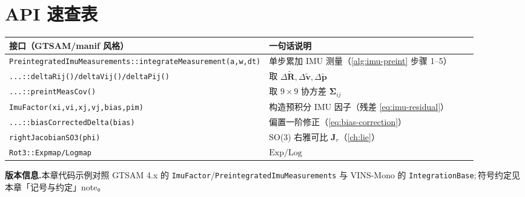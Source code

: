 \section*{API 速查表}
\begin{table}[H]\centering\small
\begin{tabular}{p{0.40\linewidth}p{0.50\linewidth}}
\toprule
接口（GTSAM/manif 风格）& 一句话说明 \\
\midrule
\texttt{PreintegratedImuMeasurements::integrateMeasurement(a,w,dt)} & 单步累加 IMU 测量（\cref{alg:imu-preint} 步骤 1--5） \\
\texttt{...::deltaRij()/\allowbreak deltaVij()/\allowbreak deltaPij()} & 取 $\Delta\tilde{\mathbf R},\Delta\tilde{\mathbf v},\Delta\tilde{\mathbf p}$ \\
\texttt{...::preintMeasCov()} & 取 $9\times9$ 协方差 $\boldsymbol\Sigma_{ij}$ \\
\texttt{ImuFactor(xi,vi,xj,vj,bias,pim)} & 构造预积分 IMU 因子（残差 \cref{eq:imu-residual}） \\
\texttt{...::biasCorrectedDelta(bias)} & 偏置一阶修正（\cref{eq:bias-correction}） \\
\texttt{rightJacobianSO3(phi)} & SO(3) 右雅可比 $\mathbf J_r$（\cref{ch:lie}） \\
\texttt{Rot3::Expmap/\allowbreak Logmap} & $\mathrm{Exp}/\mathrm{Log}$ \\
\bottomrule
\end{tabular}
\end{table}

\noindent\textbf{版本信息.}\;本章代码示例对照 GTSAM 4.x 的 \texttt{ImuFactor}/\allowbreak\texttt{PreintegratedImuMeasurements} 与 VINS-Mono 的 \texttt{IntegrationBase};\,符号约定见本章「记号与约定」note。
